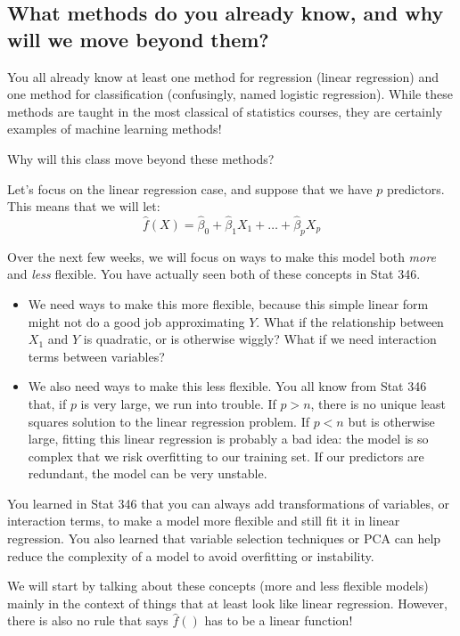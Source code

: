 \subsection{What methods do you already know, and why will we move beyond them?}

You all already know at least one method for regression (linear regression) and one method for classification (confusingly, named logistic regression). While these methods are taught in the most classical of statistics courses, they are certainly examples of machine learning methods! 

Why will this class move beyond these methods? 

Let's focus on the linear regression case, and suppose that we have $p$ predictors. This means that we will let:
$$
\hat{f}(X) = \hat{\beta}_0 + \hat{\beta}_1 X_1 + \ldots + \hat{\beta}_p X_p
$$

Over the next few weeks, we will focus on ways to make this model both \emph{more} and \emph{less} flexible. You have actually seen both of these concepts in Stat 346. 

\begin{itemize}
\item We need ways to make this more flexible, because this simple linear form might not do a good job approximating $Y$. What if the relationship between $X_1$ and $Y$ is quadratic, or is otherwise wiggly? What if we need interaction terms between variables? 
\item We also need ways to make this less flexible. You all know from Stat 346 that, if $p$ is very large, we run into trouble. If $p > n$, there is no unique least squares solution to the linear regression problem. If $p < n$ but is otherwise large, fitting this linear regression is probably a bad idea: the model is so complex that we risk overfitting to our training set. If our predictors are redundant, the model can be very unstable. 
\end{itemize}

You learned in Stat 346 that you can always add transformations of variables, or interaction terms, to make a model more flexible and still fit it in linear regression. You also learned that variable selection techniques or PCA can help reduce the complexity of a model to avoid overfitting or instability. 

We will start by talking about these concepts (more and less flexible models) mainly in the context of things that at least look like linear regression. However, there is also no rule that says $\hat{f}()$ has to be a linear function! 

